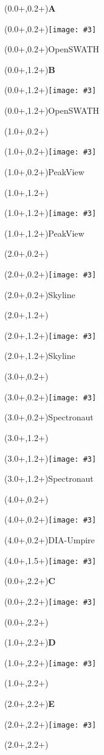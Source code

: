 \documentclass{article}
\newlength{\panelWidth} \newlength{\panelHeight}
\newlength{\labXshift} \newlength{\labYshift}
\newlength{\picXshift} \newlength{\picYshift}
\newlength{\txtXshift} \newlength{\txtYshift}
\newlength{\picWidth}
\newcommand{\txt}[3]{\begin{textblock*}{\panelWidth}(#1+\txtXshift,#2+\txtYshift){#3}\end{textblock*}}
\newcommand{\lab}[3]{\begin{textblock*}{\panelWidth}(#1+\labXshift,#2+\labYshift)\textbf{\LARGE #3}\end{textblock*}}
\newcommand{\pic}[3]{\begin{textblock*}{\panelWidth}(#1+\picXshift,#2+\picYshift)\texttt{[image: \#3]}\end{textblock*}}
\newcommand{\picVarWidth}[4]{\begin{textblock*}{\panelWidth}(#1+\picXshift,#2+\picYshift)\texttt{[image: \#3]}\end{textblock*}}
\newcommand{\fig}[5]{ \lab{#1}{#2}{#3} \pic{#1}{#2}{#4} \txt{#1}{#2}{#5} }
\newcommand{\figVarWidth}[6]{ \lab{#1}{#2}{#3} \picVarWidth{#1}{#2}{#4}{#6} \txt{#1}{#2}{#5} }
\begin{document}


\fig{0.0\panelWidth}{0.2\panelHeight}{A}{./OpenSWATH_r1.pdf}{OpenSWATH}
\fig{0.0\panelWidth}{1.2\panelHeight}{B}{./OpenSWATH_r2.pdf}{OpenSWATH}
\fig{1.0\panelWidth}{0.2\panelHeight}{}{./PeakView_r1.pdf}{PeakView}
\fig{1.0\panelWidth}{1.2\panelHeight}{}{./PeakView_r2.pdf}{PeakView}
\fig{2.0\panelWidth}{0.2\panelHeight}{}{./Skyline_r1.pdf}{Skyline}
\fig{2.0\panelWidth}{1.2\panelHeight}{}{./Skyline_r2.pdf}{Skyline}
\fig{3.0\panelWidth}{0.2\panelHeight}{}{./Spectronaut_r1.pdf}{Spectronaut}
\fig{3.0\panelWidth}{1.2\panelHeight}{}{./Spectronaut_r2.pdf}{Spectronaut}
\fig{4.0\panelWidth}{0.2\panelHeight}{}{./DIAumpire_r1.pdf}{DIA-Umpire}
\pic{4.0\panelWidth}{1.5\panelHeight}{./species_legend_v.pdf}

\fig{0.0\panelWidth}{2.2\panelHeight}{C}{./missing_values_proteins_r1.pdf}{}
\fig{1.0\panelWidth}{2.2\panelHeight}{D}{./missing_values_proteins_r2.pdf}{}
\figVarWidth{2.0\panelWidth}{2.2\panelHeight}{E}{./software_boxplots_low_intensity_range_ecoli_nobuiltin.pdf}{}{1.3\picWidth}
\end{document}
